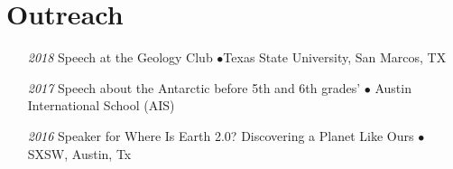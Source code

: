 \section*{Outreach}

\begin{itemize}[leftmargin=3.8em, labelsep=1.5em]
    \setlength\itemsep{-.5em}
    \item[\textit{2018}] Speech at the Geology Club $\bullet$Texas State University, San Marcos, TX
    \item[\textit{2017}] Speech about the Antarctic before 5th and 6th grades' $\bullet$ Austin International School (AIS)
    \item[\textit{2016}] Speaker for Where Is Earth 2.0? Discovering a Planet Like Ours $\bullet$ SXSW, Austin, Tx
\end{itemize}